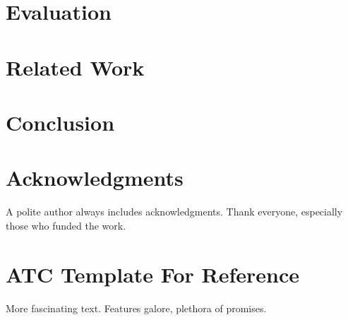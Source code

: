 \documentclass[letterpaper,twocolumn,10pt]{article}
\begin{document}
\section{Evaluation}


\section{Related Work}


\section{Conclusion}


\section*{Acknowledgments}

A polite author always includes acknowledgments.  Thank everyone,
especially those who funded the work. 


\section*{ATC Template For Reference}

More fascinating text. Features galore, plethora of promises.\\


{\normalsize 
}

\theendnotes
\end{document}
